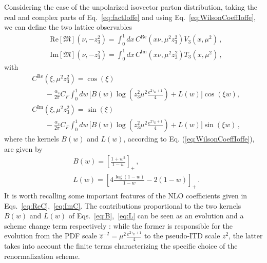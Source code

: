 Considering the case of the unpolarized isovector parton distribution, 
taking the real and complex parts of Eq.~\eqref{eq:factIoffe} and using Eq.~\eqref{eq:WilsonCoeffIoffe}, 
we can define the two lattice observables
\begin{align}
	\label{eq:Reppdf}
    &\text{Re}\left[\mathfrak{M}\right]\left(\nu, -z_3^2\right) 
    = \int_{0}^{1} dx\,C^{\text{Re}}\left(x\nu,\mu^2 z_3^2\right)V_3\left(x,\mu^2\right)\, ,\\
	\label{eq:Imppdf}
    &\text{Im}\left[\mathfrak{M}\right]\left(\nu, -z_3^2\right) 
    = \int_{0}^{1} dx\,C^{\text{Im}}\left(x\nu,\mu^2 z_3^2\right)T_3\left(x,\mu^2\right)\, ,
\end{align}
with
\begin{align}
	\label{eq:ReC}
	&C^{\text{Re}}\left(\xi,\mu^2 z_3^2\right) 
    = \cos\left(\xi\right) \nonumber\\
    &\,\,\,\,\,\,\,\,\,\,\,-\frac{\alpha_s}{2\pi} C_F \int_0^1 dw \, \biggl[B\left(w\right) 
    \log\left(z_3^2\mu^2\frac{e^{2\gamma_E + 1}}{4}\right) + L\left(w\right)\biggr] \cos\left(\xi w\right), \\
    \label{eq:ImC}
	&C^{\text{Im}}\left(\xi,\mu^2 z_3^2\right) 
    = \sin\left(\xi\right) \nonumber\\
    &\,\,\,\,\,\,\,\,\,\,\,-\frac{\alpha_s}{2\pi} C_F \int_0^1 dw \, \biggl[B\left(w\right)
    \log\left(z_3^2\mu^2\frac{e^{2\gamma_E + 1}}{4}\right)  + L\left(w\right)\biggr] \sin\left(\xi w\right)\, ,
\end{align}
where the kernels $B\left(w\right)$ and $L\left(w\right)$, 
according to Eq. (\ref{eq:WilsonCoeffIoffe}), are given by 
\begin{align}
    \label{eq:B}
    &B\left(w\right) = \left[\frac{1+w^2}{1-w}\right]_+ \, ,\\
    \label{eq:L}
    &L\left(w\right) = \left[4\frac{\log\left(1-w\right)}{1-w} -2\left(1-w\right)\right]_+ \, .
\end{align}
It is worth recalling some important features of the NLO coefficients given in Eqs.~\eqref{eq:ReC},~\eqref{eq:ImC}.
The contributions proportional to the two kernels $B\left(w\right)$ and $L\left(w\right)$ of Eqs.~\eqref{eq:B},~\eqref{eq:L} 
can be seen as an evolution and a scheme change term respectively \cite{Joo:2019jct,Radyushkin:2018cvn}: 
while the former is responsible for the evolution from the PDF scale 
$\hat{z}^{-2} = \mu^2\frac{e^{2\gamma_E + 1}}{4} $ to the pseudo-ITD scale $z^2$, the latter takes into
account the finite terms characterizing the specific choice of the renormalization scheme. 
